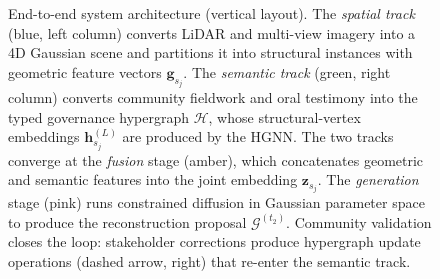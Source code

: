 \documentclass[11pt,a4paper]{article}
\theoremstyle{plain}
\theoremstyle{definition}
\theoremstyle{remark}
\newcommand{\GS}{\mathcal{G}}
\newcommand{\HG}{\mathcal{H}}
\newcommand{\gvec}{\mathbf{g}}
\newcommand{\hvec}{\mathbf{h}}
\newcommand{\zvec}{\mathbf{z}}
\begin{document}
\begin{figure}[htbp]
\caption{%
  End-to-end system architecture (vertical layout).
  The \textit{spatial track} (blue, left column) converts LiDAR and
  multi-view imagery into a 4D Gaussian scene and partitions it into
  structural instances with geometric feature vectors $\gvec_{s_j}$.
  The \textit{semantic track} (green, right column) converts community
  fieldwork and oral testimony into the typed governance hypergraph
  $\HG$, whose structural-vertex embeddings $\hvec_{s_j}^{(L)}$ are
  produced by the HGNN.  The two tracks converge at the
  \textit{fusion} stage (amber), which concatenates geometric and
  semantic features into the joint embedding $\zvec_{s_j}$.  The
  \textit{generation} stage (pink) runs constrained diffusion in
  Gaussian parameter space to produce the reconstruction proposal
  $\GS^{(t_2)}$.  Community validation closes the loop: stakeholder
  corrections produce hypergraph update operations (dashed arrow,
  right) that re-enter the semantic track.%
}
\label{fig:architecture}
\end{figure}
\end{document}

